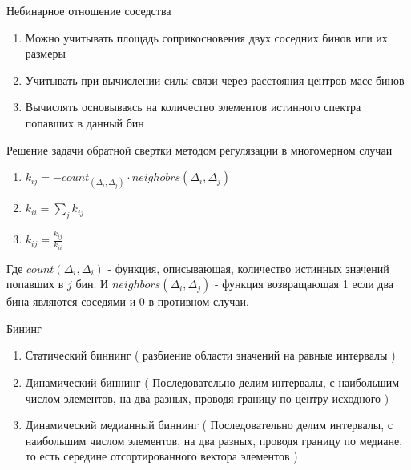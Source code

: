 \documentclass[fullscreen=true,russian,compress,%
	hyperref={unicode,bookmarks=false}]{presentation}
\begin{document}
\begin{frame}{Небинарное отношение соседства}

   \begin{enumerate}
      \item Можно учитывать площадь соприкосновения двух соседних бинов или их размеры
      \item Учитывать при вычислении силы связи через расстояния центров масс бинов
      \item Вычислять основываясь на количество элементов истинного спектра попавших в данный бин
   \end{enumerate}

\end{frame}

\begin{frame}{Решение задачи обратной свертки методом регулязации в многомерном случаи}
   \begin{enumerate}
      \item  $k_{ij} = - count_(\Delta_{i}, \Delta_{j}) \cdot neighobrs(\Delta_{i}, \Delta_{j})$ \\
      \item  $k_{ii} = \displaystyle\sum_{j} k_{ij}$ \\
      \item  $k_{ij} = \frac{k_{ij}}{k_{ii}}$
   \end{enumerate}
   Где $count(\Delta_{i}, \Delta_{i})$ - функция, описывающая, количество истинных значений попавших в $j$ бин. 
   И $neighbors(\Delta_{i}, \Delta_{j})$ - функция возвращающая 1 если два бина являются соседями и 0 в противном случаи.
\end{frame}



\begin{frame}{Бининг}
   \begin{enumerate}
      \item Статический биннинг ( разбиение области значений на равные интервалы ) \\
      
      \item Динамический биннинг ( Последовательно делим интервалы, с наибольшим числом элементов, 
      на два разных, проводя границу по центру исходного ) \\
   
      \item Динамический медианный биннинг ( Последовательно делим интервалы, с наибольшим числом элементов, 
      на два разных, проводя границу по медиане, то есть середине отсортированного вектора элементов )
   \end{enumerate}
\end{frame}
\end{document}
